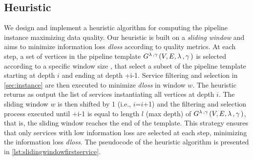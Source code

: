 
\subsection{Heuristic}\label{subsec:heuristics}
We design and implement a heuristic algorithm for computing the pipeline instance maximizing data quality. Our heuristic is built on a \emph{sliding window} and aims to minimize information loss \emph{dloss} according to quality metrics. At each step, a set of vertices in the pipeline template $G^{\lambda\,,\gamma\,}(V,E,\lambda\,,\gamma\,)$ is selected according to a specific window size \windowsize, that select a subset of the pipeline template starting at depth $i$ and ending at depth \windowsize+i-1. Service filtering and selection in \cref{sec:instance} are then executed to minimize \emph{dloss} in window $w$. The heuristic returns as output the list of services instantiating all vertices at depth $i$. The sliding window $w$ is then shifted by 1 (i.e., $i$=$i$+1) and the filtering and selection process executed until \windowsize+i-1 is equal to length $l$ (max depth) of $G^{\lambda\,,\gamma\,}(V,E,\lambda\,,\gamma\,)$, that is, the sliding window reaches the end of the template.
This strategy ensures that only services with low information loss are selected at each step, minimizing the information loss \emph{dloss}. The pseudocode of the heuristic algorithm is presented in \cref{lst:slidingwindowfirstservice}.

